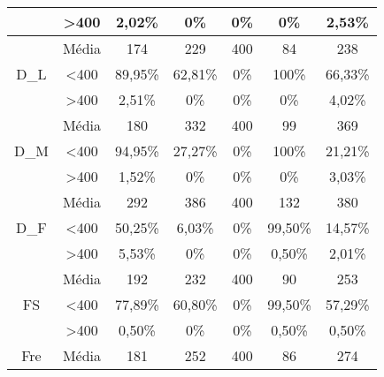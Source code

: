 \begin{table}[H]
\begin{tabular}{|c|c|ccccc|}
                                & \textgreater 400 & 2,02\%            & 0\%            & 0\%            & 0\%            & 2,53\%            \\ \hline
\multirow{3}{*}{D\_L}           & Média            & 174               & 229               & 400               & 84                & 238               \\
                                & \textless 400    & 89,95\%           & 62,81\%           & 0\%            & 100\%          & 66,33\%           \\
                                & \textgreater 400 & 2,51\%            & 0\%            & 0\%            & 0\%            & 4,02\%            \\ \hline
\multirow{3}{*}{D\_M}           & Média            & 180               & 332               & 400               & 99                & 369               \\
                                & \textless 400    & 94,95\%           & 27,27\%           & 0\%            & 100\%          & 21,21\%           \\
                                & \textgreater 400 & 1,52\%            & 0\%            & 0\%            & 0\%            & 3,03\%            \\ \hline
\multirow{3}{*}{D\_F}           & Média            & 292               & 386               & 400               & 132               & 380               \\
                                & \textless 400    & 50,25\%           & 6,03\%            & 0\%            & 99,50\%           & 14,57\%           \\
                                & \textgreater 400 & 5,53\%            & 0\%            & 0\%            & 0,50\%            & 2,01\%            \\ \hline
\multirow{3}{*}{FS}             & Média            & 192               & 232               & 400               & 90                & 253               \\
                                & \textless 400    & 77,89\%           & 60,80\%           & 0\%            & 99,50\%           & 57,29\%           \\
                                & \textgreater 400 & 0,50\%            & 0\%            & 0\%            & 0,50\%            & 0,50\%            \\ \hline
\multirow{3}{*}{Fre}            & Média            & 181               & 252               & 400               & 86                & 274               \\

\end{tabular}
\end{table}
